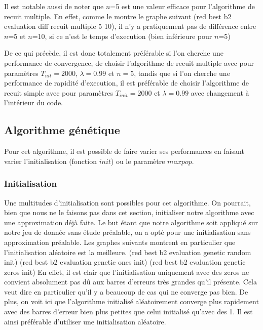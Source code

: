 \documentclass[11pt,french]{report}
\begin{document}
        Il est notable aussi de noter que $n$=5 est une valeur efficace pour l'algorithme de recuit multiple. En effet, comme le montre le graphe suivant ({{red} best b2 evaluation diff recuit multiple 5 10}), il n'y a pratiquement pas de différence entre $n$=5 et $n$=10, si ce n'est le temps d'execution (bien inférieure pour $n$=5)

        


        De ce qui précède, il est donc totalement préférable si l'on cherche une performance de convergence, de choisir l'algorithme de recuit multiple avec pour paramètres $T_{nit} = 2000$,  $\lambda = 0.99$ et $n=5$, tandis que si l'on cherche une performance de rapidité d'execution, il est préférable de choisir l'algorithme de recuit simple avec pour paramètres $T_{init} = 2000$ et $\lambda = 0.99$ avec changement à l'intérieur du code.


        \subsection{Algorithme génétique}
        Pour cet algorithme, il est possible de faire varier ses performances en faisant varier l'initialisation (fonction $init$) ou le paramètre $maxpop$.

        \subsubsection{Initialisation}
        
        Une multitudes d'initialisation sont possibles pour cet algorithme. On pourrait, bien que nous ne le faisons pas dans cet section, initialiser notre algorithme avec une approximation déjà faite. Le but étant que notre algorithme soit appliqué sur notre jeu de donnée sans étude préalable, on a opté pour une initialisation sans approximation préalable. Les graphes suivants montrent en particulier que l'initialisation aléatoire est la meilleure. ({{red} best b2 evaluation genetic random init})  ({{red} best b2 evaluation genetic ones init})  ({{red} best b2 evaluation genetic zeros init})
        En effet, il est clair que l'initialisation uniquement avec des zeros ne convient absolument pas dû aux barres d'erreurs très grandes qu'il présente. Cela veut dire en particulier qu'il y a beaucoup de cas qui ne converge pas bien. De plus, on voit ici que l'algorithme initialisé aléatoirement converge plus rapidement avec des barres d'erreur bien plus petites que celui initialisé qu'avec des 1.
        Il est ainsi préférable d'utiliser une initialisation aléatoire.
\end{document}
